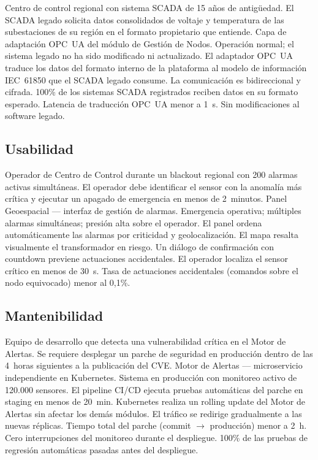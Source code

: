 \documentclass[12pt, letterpaper]{article}
\begin{document}
  {Centro de control regional con sistema SCADA de 15 años de antigüedad.}
  {El SCADA legado solicita datos consolidados de voltaje y temperatura de las
   subestaciones de su región en el formato propietario que entiende.}
  {Capa de adaptación OPC~UA del módulo de Gestión de Nodos.}
  {Operación normal; el sistema legado no ha sido modificado ni actualizado.}
  {El adaptador OPC~UA traduce los datos del formato interno de la plataforma al modelo
   de información IEC~61850 que el SCADA legado consume. La comunicación es
   bidireccional y cifrada.}
  {100\% de los sistemas SCADA registrados reciben datos en su formato esperado.
   Latencia de traducción OPC~UA menor a 1~s. Sin modificaciones al software legado.}

\subsection{Usabilidad}

  {Operador de Centro de Control durante un blackout regional con 200 alarmas activas
   simultáneas.}
  {El operador debe identificar el sensor con la anomalía más crítica y ejecutar un
   apagado de emergencia en menos de 2~minutos.}
  {Panel Geoespacial --- interfaz de gestión de alarmas.}
  {Emergencia operativa; múltiples alarmas simultáneas; presión alta sobre el operador.}
  {El panel ordena automáticamente las alarmas por criticidad y geolocalización. El
   mapa resalta visualmente el transformador en riesgo. Un diálogo de confirmación con
   countdown previene actuaciones accidentales.}
  {El operador localiza el sensor crítico en menos de 30~s. Tasa de actuaciones
   accidentales (comandos sobre el nodo equivocado) menor al 0,1\%.}

\subsection{Mantenibilidad}

  {Equipo de desarrollo que detecta una vulnerabilidad crítica en el Motor de Alertas.}
  {Se requiere desplegar un parche de seguridad en producción dentro de las 4~horas
   siguientes a la publicación del CVE.}
  {Motor de Alertas --- microservicio independiente en Kubernetes.}
  {Sistema en producción con monitoreo activo de 120.000 sensores.}
  {El pipeline CI/CD ejecuta pruebas automáticas del parche en staging en menos de
   20~min. Kubernetes realiza un rolling update del Motor de Alertas sin afectar los
   demás módulos. El tráfico se redirige gradualmente a las nuevas réplicas.}
  {Tiempo total del parche (commit $\rightarrow$ producción) menor a 2~h. Cero
   interrupciones del monitoreo durante el despliegue. 100\% de las pruebas de
   regresión automáticas pasadas antes del despliegue.}
\end{document}
